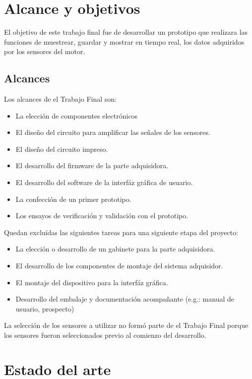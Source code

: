 \section{Alcance y objetivos}

El objetivo de este trabajo final fue de desarrollar un prototipo que realizara las funciones de muestrear, guardar y mostrar en tiempo real, los datos adquiridos por los sensores del motor.

\subsection{Alcances}

Los alcances de el Trabajo Final son:
\begin{itemize}
\item La elección de componentes electrónicos
\item El diseño del circuito para amplificar las señales de los sensores.
\item El diseño del circuito impreso.
\item El desarrollo del firmware de la parte adquisidora.
\item El desarrollo del software de la interfáz gráfica de usuario.
\item La confección de un primer prototipo.
\item Los ensayos de verificación y validación con el prototipo.
\end{itemize}

Quedan excluídas las siguientes tareas para una siguiente etapa del proyecto:
\begin{itemize}
\item La elección o desarrollo de un gabinete para la parte adquisidora.
\item El desarrollo de los componentes de montaje del sistema adquisidor.
\item El montaje del dispositivo para la interfáz gráfica.
\item Desarrollo del embalaje y documentación acompañante (e.g.: manual de usuario, prospecto)
\end{itemize}

La selección de los sensores a utilizar no formó parte de el Trabajo Final porque los sensores fueron seleccionados previo al comienzo del desarrollo.

\section{Estado del arte}

